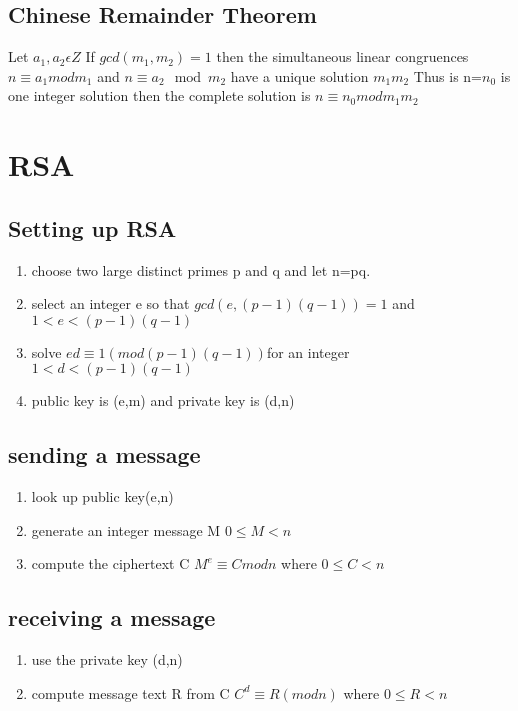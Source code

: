\documentclass[12pt]{article}
\begin{document}
\subsection{Chinese Remainder Theorem}
Let $a_1, a_2 \epsilon Z$ If $gcd(m_1, m_2)=1$ then the simultaneous linear
congruences $n\equiv a_1mod m_1$ and $n\equiv a_2 \mod m_2 $ have a unique
solution \modulo $m_1m_2$ Thus is n=$n_0$ is one integer solution then the
complete solution is $n\equiv n_0 mod m_1 m_2$
\section{RSA}
\subsection{Setting up RSA}
\begin{enumerate}

  \item choose two large distinct primes p and q and let n=pq.
  \item select an integer e so that $gcd(e,(p-1)(q-1))=1$ and $1<e<(p-1)(q-1)$
  \item solve $ed\equiv 1(mod (p-1)(q-1))$for an integer $1<d<(p-1)(q-1)$
  \item public key is (e,m) and private key is (d,n)
\end{enumerate}
\subsection{sending a message}
\begin{enumerate}
  \item look up public key(e,n)
  \item generate an integer message M $0\leq M < n$
  \item compute the ciphertext C $M^e\equiv C mod n$ where $0\leq C < n$
\end{enumerate}
\subsection{receiving a message}
\begin{enumerate}
  \item use the private key (d,n)
  \item compute message text R from C $C^d\equiv R (mod n)$ where $0\leq R <n$
\end{enumerate}
\end{document}
